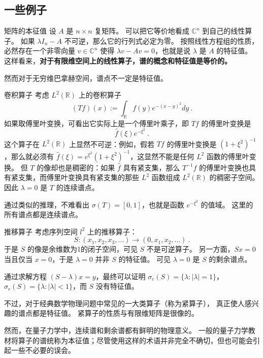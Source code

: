 \subsection{一些例子}
\begin{example}{矩阵的本征值}
设 $A$ 是 $n\times n$ 复矩阵。 可以把它等价地看成 $\mathbb{C}^n$ 到自己的线性算子。 如果 $\lambda I_n-A$ 不可逆，那么它的行列式必定为零。 按照线性方程组的性质，必然存在一个非零向量 $v\in \mathbb{C}^n$ 使得 $\lambda v-Av=0$，也就是说 $\lambda$ 是 $A$ 的特征值。 这样看来，\textbf{对于有限维空间上的线性算子，谱的概念和特征值是等价的。}
\end{example}

然而对于无穷维巴拿赫空间，谱点不一定是特征值。

\begin{example}{卷积算子}
考虑 $L^2(\mathbb{R})$ 上的卷积算子
$$
(Tf)(x):=\int_{\mathbb{R}}f(y)e^{-(x-y)^2}dy~.
$$
如果取傅里叶变换，可看出它实际上是一个傅里叶乘子，即 $Tf$ 的傅里叶变换是
$$
\hat f(\xi)e^{-\xi^2}~.
$$
这个算子在 $L^2(\mathbb{R})$ 上显然不可逆：例如，假若 $Tf$ 的傅里叶变换是 $(1+\xi^2)^{-1}$，那么就必须有 $\hat f(\xi)=e^{\xi^2}(1+\xi^2)^{-1}$，这显然不能是任何 $L^2$ 函数的傅里叶变换。 但 $T$ 的像却也是稠密的：如果 $\hat f$ 具有紧支集，那么 $T^{-1}f$ 的傅里叶变换也具有紧支集，而傅里叶变换具有紧支集的那些 $L^2$ 函数组成 $L^2(\mathbb{R})$ 的稠密子空间。 因此 $\lambda=0$ 是 $T$ 的连续谱点。

通过类似的推理，不难看出 $\sigma(T)=[0,1]$，也就是函数 $e^{-\xi^2}$ 的值域。 这里的所有谱点都是连续谱点。
\end{example}

\begin{example}{推移算子}
考虑序列空间 $l^2$ 上的推移算子：
$$
S:(x_1,x_2,x_3,\dots)\to(0,x_1,x_2,\dots)~.
$$
于是 $S$ 的像是余维数为1的闭子空间，可见 $S$ 不是可逆算子。 另一方面，$Sx=0$ 当且仅当 $x=0$，于是 $\lambda=0$ 并非 $S$ 的特征值。 可见 $\lambda=0$ 是 $S$ 的剩余谱点。

通过求解方程 $(S-\lambda)x=y$，最终可以证明 $\sigma_c(S)=\{\lambda:|\lambda|=1\}$，$\sigma_r(S)=\{\lambda:|\lambda|<1\}$，而 $S$ 没有特征值。
\end{example}

不过，对于经典数学物理问题中常见的一大类算子（称为紧算子）， 真正使人感兴趣的谱点都是特征值。 紧算子的性质与有限维矩阵是很像的。

然而，在量子力学中，连续谱和剩余谱都有鲜明的物理意义。 一般的量子力学教材将算子的谱统称为本征值；尽管使用这样的术语并非完全不确切，但也可能会引起一些不必要的误会。
